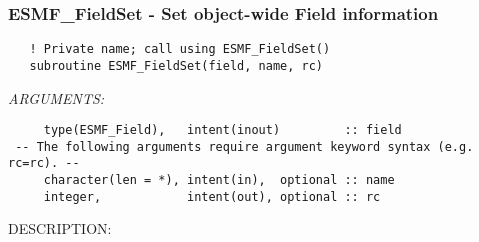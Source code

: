  
\setlength{\oldparskip}{\parskip}
\setlength{\parskip}{1.5ex}
\setlength{\oldparindent}{\parindent}
\setlength{\parindent}{0pt}
\setlength{\oldbaselineskip}{\baselineskip}
\setlength{\baselineskip}{11pt}
 
\def\bv{\begin{verbatim}}
\def\ev{\end{verbatim}}
\def\be{\begin{equation}}
\def\ee{\end{equation}}
\def\bea{\begin{eqnarray}}
\def\eea{\end{eqnarray}}
\def\bi{\begin{itemize}}
\def\ei{\end{itemize}}
\def\bn{\begin{enumerate}}
\def\en{\end{enumerate}}
\def\bd{\begin{description}}
\def\ed{\end{description}}
\def\({\left (}
\def\){\right )}
\def\[{\left [}
\def\]{\right ]}
\def\<{\left  \langle}
\def\>{\right \rangle}
\def\cI{{\cal I}}
\def\diag{\mathop{\rm diag}}
\def\tr{\mathop{\rm tr}}


 
\subsubsection [ESMF\_FieldSet] {ESMF\_FieldSet - Set object-wide Field information}


  
\begin{verbatim}   ! Private name; call using ESMF_FieldSet()
   subroutine ESMF_FieldSet(field, name, rc)
 \end{verbatim}{\em ARGUMENTS:}
\begin{verbatim}     type(ESMF_Field),   intent(inout)         :: field
 -- The following arguments require argument keyword syntax (e.g. rc=rc). --
     character(len = *), intent(in),  optional :: name
     integer,            intent(out), optional :: rc\end{verbatim}
{\sf DESCRIPTION:\\ }


